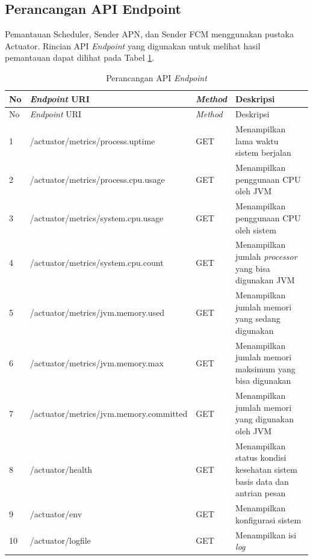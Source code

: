 \subsection{Perancangan API Endpoint}
\par Pemantauan Scheduler, Sender APN, dan Sender FCM menggunakan pustaka Actuator. Rincian API \textit{Endpoint} yang digunakan untuk melihat hasil pemantauan dapat dilihat pada Tabel \ref{t:rancangan_api}.
\begin{longtable}[H]{|p{0.5cm}|p{3.5cm}|p{1.2cm}|p{3.5cm}|}
	\caption{Perancangan API \textit{Endpoint}} \label{t:rancangan_api} \\ \hline
	\rowcolor{lightgray} No & \textit{Endpoint} URI & \textit{Method} & Deskripsi \\ \hline
	\endfirsthead
	\hline
	\rowcolor{lightgray} No & \textit{Endpoint} URI & \textit{Method} & Deskripsi \\ \hline
	\endhead
	1 & /actuator/metrics/\newline process.uptime & GET & Menampilkan lama waktu sistem berjalan \\ \hline
	2 & /actuator/metrics/\newline process.cpu.usage & GET & Menampilkan penggunaan CPU oleh JVM \\ \hline
	3 & /actuator/metrics/\newline system.cpu.usage & GET & Menampilkan penggunaan CPU oleh sistem \\ \hline
	4 & /actuator/metrics/\newline system.cpu.count & GET & Menampilkan jumlah \textit{processor} yang bisa digunakan JVM \\ \hline
	5 & /actuator/metrics/\newline jvm.memory.used & GET & Menampilkan jumlah memori yang sedang digunakan \\ \hline
	6 & /actuator/metrics/\newline jvm.memory.max & GET & Menampilkan jumlah memori maksimum yang bisa digunakan \\ \hline
	7 & /actuator/metrics/\newline jvm.memory.committed & GET & Menampilkan jumlah memori yang digunakan oleh JVM \\ \hline
	8 & /actuator/health & GET & Menampilkan status kondisi kesehatan sistem basis data dan antrian pesan \\ \hline
	9 & /actuator/env & GET & Menampilkan konfigurasi sistem \\ \hline
	10 & /actuator/logfile & GET & Menampilkan isi \textit{log} \\ \hline
\end{longtable}
